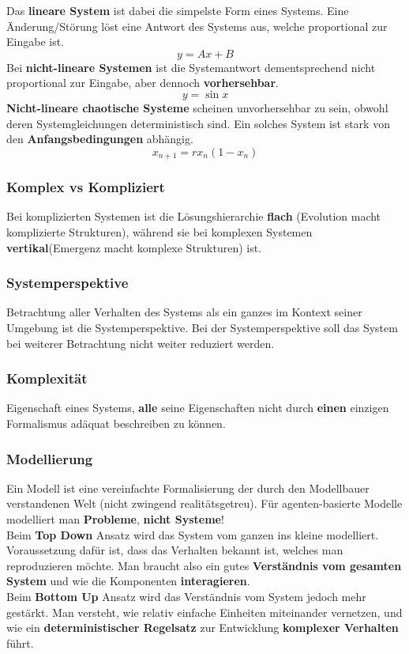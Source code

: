 \documentclass[a4paper]{article}
\begin{document}
Das \textbf{lineare System} ist dabei die simpelste Form eines Systems. Eine Änderung/Störung löst eine Antwort des Systems aus, welche proportional zur Eingabe ist.
$$y=Ax+B$$
Bei \textbf{nicht-lineare Systemen} ist die Systemantwort dementsprechend nicht proportional zur Eingabe, aber dennoch \textbf{vorhersehbar}. 
$$y = \sin x$$
\textbf{Nicht-lineare chaotische Systeme} scheinen unvorhersehbar zu sein, obwohl deren Systemgleichungen deterministisch sind. Ein solches System ist stark von den \textbf{Anfangsbedingungen} abhängig.
$$x_{n+1}=rx_n(1-x_n)$$
\subsubsection{Komplex vs Kompliziert}
Bei komplizierten Systemen ist die Lösungshierarchie \textbf{flach} (Evolution macht komplizierte Strukturen), während sie bei komplexen Systemen \textbf{vertikal}(Emergenz macht komplexe Strukturen) ist.
\subsubsection{Systemperspektive}
Betrachtung aller Verhalten des Systems als ein ganzes im Kontext seiner Umgebung ist die Systemperspektive. Bei der Systemperspektive soll das System bei weiterer Betrachtung nicht weiter reduziert werden.
\subsubsection{Komplexität}
Eigenschaft eines Systems, \textbf{alle} seine Eigenschaften nicht durch \textbf{einen} einzigen Formalismus adäquat beschreiben zu können.
\subsubsection{Modellierung}
Ein Modell ist eine vereinfachte Formalisierung der durch den Modellbauer verstandenen Welt (nicht zwingend realitätsgetreu). Für agenten-basierte Modelle modelliert man \textbf{Probleme}, \textbf{nicht Systeme}!\\

Beim \textbf{Top Down} Ansatz wird das System vom ganzen ins kleine modelliert. Voraussetzung dafür ist, dass das Verhalten bekannt ist, welches man reproduzieren möchte. Man braucht also ein gutes \textbf{Verständnis vom gesamten System} und wie die Komponenten \textbf{interagieren}.\\

Beim \textbf{Bottom Up} Ansatz wird das Verständnis vom System jedoch mehr gestärkt. Man versteht, wie relativ einfache Einheiten miteinander vernetzen, und wie ein \textbf{deterministischer Regelsatz} zur Entwicklung \textbf{komplexer Verhalten} führt.\\
\end{document}
